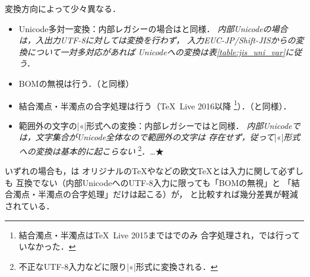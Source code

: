 \documentclass[a4paper,11pt,nomag,dvipdfmx]{jsarticle}
\begin{document}
\begin{itemize}
   変換方向によって少々異なる．
%
\begin{itemize}
 \item Unicode多対一変換：内部レガシーの場合は\pTeX と同様．
  \emph{内部Unicodeの場合は，入出力UTF-8に対しては変換を行わず，
  入力EUC-JP/Shift-JISからの変換について一対多対応があれば
  Unicodeへの変換は表\ref{table:jis_uni_var}に従う．}
 \item BOMの無視は行う．（\pTeX と同様）
 \item 結合濁点・半濁点の合字処理は行う（\TeX~Live 2016以降
  \footnote{結合濁点・半濁点は\TeX~Live 2015までは\pTeX でのみ
  合字処理され，\upTeX では行っていなかった．}）．（\pTeX と同様）．
 \item 範囲外の文字の|^^ab|形式への変換：内部レガシーでは\pTeX と同様．
  \emph{内部Unicodeでは，文字集合がUnicode全体なので範囲外の文字は
  存在せず，従って}|^^ab|\emph{形式への変換は基本的に起こらない}
  \footnote{不正なUTF-8入力などに限り|^^ab|形式に変換される．}．…★
\end{itemize}
%
\end{itemize}

いずれの場合も，\upTeX は
オリジナルの\TeX や\pdfTeX などの欧文\TeX とは入力に関して必ずしも
互換でない（内部UnicodeへのUTF-8入力に限っても「BOMの無視」と
「結合濁点・半濁点の合字処理」だけは起こる）が，
\pTeX と比較すれば幾分差異が軽減されている．
\end{document}
